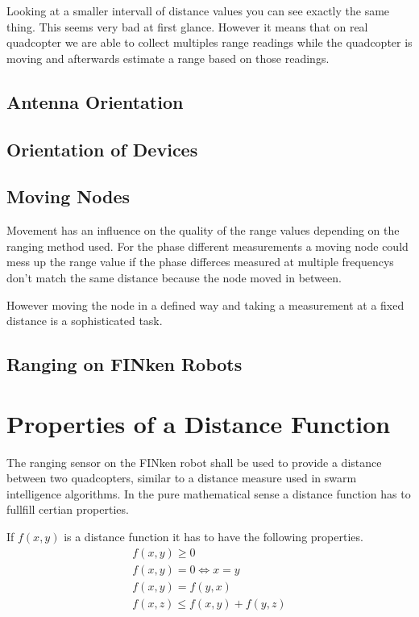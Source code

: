 Looking at a smaller intervall of distance values you can see exactly the same thing.
This seems very bad at first glance.
However it means that on real quadcopter we are able to collect multiples range readings while the quadcopter is moving and afterwards estimate a range based on those readings. 

\subsection{Antenna Orientation}



\subsection{Orientation of Devices}


\subsection{Moving Nodes}
Movement has an influence on the quality of the range values depending on the ranging method used.
For the phase different measurements a moving node could mess up the range value if the phase differces measured at multiple frequencys don't match the same distance because the node moved in between. 

However moving the node in a defined way and taking a measurement at a fixed distance is a sophisticated task.

\subsection{Ranging on FINken Robots}

\section{Properties of a Distance Function}
The ranging sensor on the FINken robot shall be used to provide a distance between two quadcopters, similar to a distance measure used in swarm intelligence algorithms.
In the pure mathematical sense a distance function has to fullfill certian properties.

If $f(x, y)$ is a distance function it has to have the following properties.
\begin{eqnarray}
f(x, y) \ge 0 \\
f(x, y) = 0 \iff x = y \\ 
f(x, y) = f(y, x) \\ 
f(x, z) \le f(x, y) + f(y, z)
\end{eqnarray}

